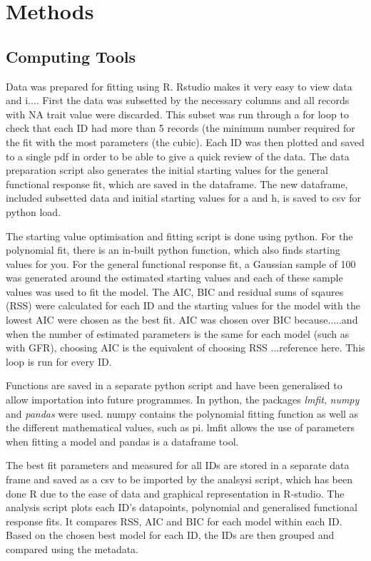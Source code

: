 \documentclass[11pt, a4paper, titlepage]{article}
\begin{document}
\section{Methods}

\subsection{Computing Tools}

Data was prepared for fitting using R. Rstudio makes it very easy to view data and i.... First the data was subsetted by the necessary columns and all records with NA trait value were discarded. This subset was run through a for loop to check that each ID had more than 5 records (the minimum number required for the fit with the most parameters (the cubic). Each ID was then plotted and saved to a single pdf in order to be able to give a quick review of the data. The data preparation script also generates the initial starting values for the general functional response fit, which are saved in the dataframe. The new dataframe, included subsetted data and initial starting values for a and h, is saved to csv for python load.

The starting value optimisation and fitting script is done using python. For the polynomial fit, there is an in-built python function, which also finds starting values for you. For the general functional response fit, a Gaussian sample of 100 was generated around the estimated starting values and each of these sample values was used to fit the model. The AIC, BIC and residual sums of sqaures (RSS) were calculated for each ID and the starting values for the model with the lowest AIC were chosen as the best fit. AIC was chosen over BIC because.....and when the number of estimated parameters is the same for each model (such as with GFR), choosing AIC is the equivalent of choosing RSS ...reference here. This loop is run for every ID.

Functions are saved in a separate python script and have been generalised to allow importation into future programmes. In python, the packages \textit{lmfit}, \textit{numpy} and \textit{pandas} were used. numpy contains the polynomial fitting function as well as the different mathematical values, such as pi. lmfit allows the use of parameters when fitting a model and pandas is a dataframe tool.

The best fit parameters and measured for all IDs are stored in a separate data frame and saved as a csv to be imported by the analsysi script, which has been done R due to the ease of data and graphical representation in R-studio. The analysis script plots each ID's datapoints, polynomial and generalised functional response fits. It compares RSS, AIC and BIC for each model within each ID. Based on the chosen best model for each ID, the IDs are then grouped and compared using the metadata.
\end{document}
